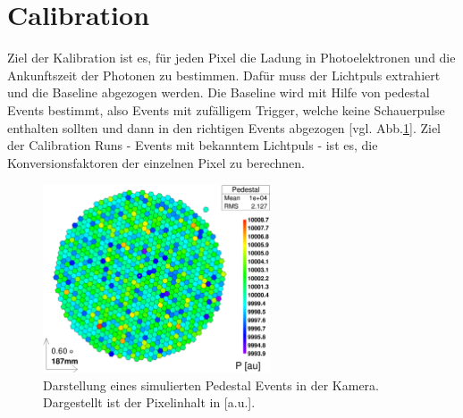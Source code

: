
\section{Calibration}
Ziel der Kalibration ist es, für jeden Pixel die Ladung in Photoelektronen und die Ankunftszeit der Photonen zu bestimmen.
Dafür muss der Lichtpuls extrahiert und die Baseline abgezogen werden.
Die Baseline wird mit Hilfe von pedestal Events bestimmt, also Events mit zufälligem Trigger, welche keine Schauerpulse enthalten sollten und dann in den richtigen Events abgezogen [vgl. Abb.\ref{Kamera-Bild-Pedestal}].
Ziel der Calibration Runs - Events mit bekanntem Lichtpuls - ist es, die Konversionsfaktoren der einzelnen Pixel zu berechnen.

\begin{figure}
    \centering
    \includegraphics[width=0.6\textwidth]{./Plots/Pedestal_fertig.png}
    \caption{Darstellung eines simulierten Pedestal Events in der Kamera. Dargestellt ist der Pixelinhalt in [a.u.].}
    \label{Kamera-Bild-Pedestal}
\end{figure}

